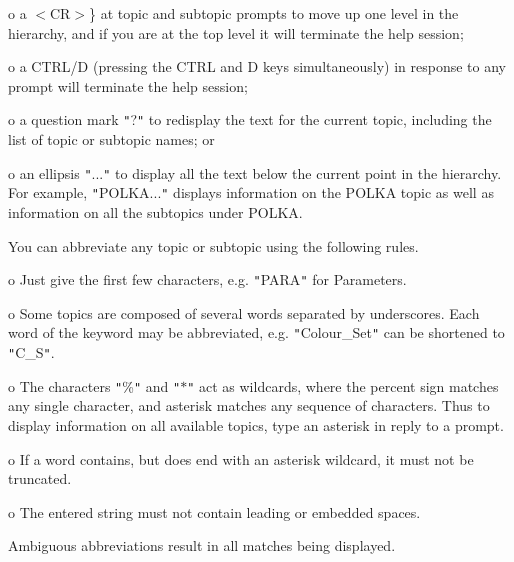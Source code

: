 {{         o  a $<$CR$>$\} at topic and subtopic prompts to move up one level
            in the hierarchy, and if you are at the top level it will
            terminate the help session;

         o  a CTRL/D (pressing the CTRL and D keys simultaneously) in
            response to any prompt will terminate the help session;

         o  a question mark {\tt "}?{\tt "} to redisplay the text for the current
            topic, including the list of topic or subtopic names; or

         o  an ellipsis {\tt "}...{\tt "} to display all the text below the
            current point in the hierarchy.  For example, {\tt "}POLKA...{\tt "}
            displays information on the POLKA topic as well as
            information on all the subtopics under POLKA.

      You can abbreviate any topic or subtopic using the following
      rules.

         o  Just give the first few characters, e.g. {\tt "}PARA{\tt "} for
            Parameters.

         o  Some topics are composed of several words separated by
            underscores.  Each word of the keyword may be abbreviated,
            e.g. {\tt "}Colour\_Set{\tt "} can be shortened to {\tt "}C\_S{\tt "}.

         o  The characters {\tt "}\%{\tt "} and {\tt "}$*${\tt "} act as wildcards, where the
            percent sign matches any single character, and asterisk
            matches any sequence of characters.  Thus to display
            information on all available topics, type an asterisk in
            reply to a prompt.

         o  If a word contains, but does end with an asterisk wildcard,
            it must not be truncated.

         o  The entered string must not contain leading or embedded
            spaces.

      Ambiguous abbreviations result in all matches being displayed.
   }
}
